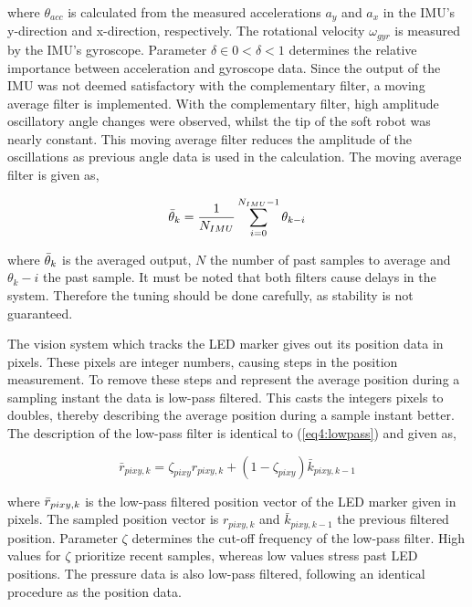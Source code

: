 where $\theta_{acc}$ is calculated from the measured accelerations $a_y$ and $a_x$ in the IMU's y-direction and x-direction, respectively. The rotational velocity $\omega_{gyr}$ is measured by the IMU's gyroscope. Parameter $\delta \in 0 < \delta < 1$ determines the relative importance between acceleration and gyroscope data. Since the output of the IMU was not deemed satisfactory with the complementary filter, a moving average filter is implemented. With the complementary filter, high amplitude oscillatory angle changes were observed, whilst the tip of the soft robot was nearly constant. This moving average filter reduces the amplitude of the oscillations as previous angle data is used in the calculation. The moving average filter is given as,

\begin{equation}
    \Bar{\theta}_k = \frac{1}{N_{IMU}}\sum_{i = 0} ^ {N_{IMU}-1} \theta_{k-i}
\end{equation}

where $\Bar{\theta}_k$ is the averaged output, $N$ the number of past samples to average and $\theta_k-i$ the past sample. It must be noted that both filters cause delays in the system. Therefore the tuning should be done carefully, as stability is not guaranteed.

The vision system which tracks the LED marker gives out its position data in pixels. These pixels are integer numbers, causing steps in the position measurement. To remove these steps and represent the average position during a sampling instant the data is low-pass filtered. This casts the integers pixels to doubles, thereby describing the average position during a sample instant better. The description of the low-pass filter is identical to (\ref{eq4:lowpass}) and given as,

\begin{equation}
\bar{r}_{pixy,k} = \zeta_{pixy} r_{pixy,k} + (1-\zeta_{pixy})\bar{k}_{pixy,k-1}
\label{eq5:lowpass}
\end{equation}

where $\Bar{r}_{pixy,k}$ is the low-pass filtered position vector of the LED marker given in pixels. The sampled position vector is $r_{pixy,k}$ and $\bar{k}_{pixy,k-1}$ the previous filtered position. Parameter $\zeta$ determines the cut-off frequency of the low-pass filter. High values for $\zeta$ prioritize recent samples, whereas low values stress past LED positions. The pressure data is also low-pass filtered, following an identical procedure as the position data. 


